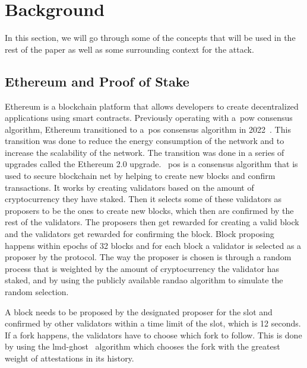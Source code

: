 
\section{Background}\label{sec:background}
In this section, we will go through some of the concepts that will be used in the rest of the paper as well as some surrounding context for the attack.

\subsection{Ethereum and Proof of Stake}\label{subsec:ethereum-and-proof-of-stake}
Ethereum is a blockchain platform that allows developers to create decentralized applications using smart contracts.
Previously operating with a~\gls{pow} consensus algorithm, Ethereum transitioned to a~\gls{pos} consensus algorithm in 2022~\cite{EthereumProof-of-stakePoS}.
This transition was done to reduce the energy consumption of the network and to increase the scalability of the network.
The transition was done in a series of upgrades called the Ethereum 2.0 upgrade.
~\gls{pos} is a consensus algorithm that is used to secure blockchain net by helping to create new blocks and confirm transactions.
It works by creating validators based on the amount of cryptocurrency they have staked.
Then it selects some of these validators as proposers to be the ones to create new blocks, which then are confirmed by the rest of the validators.
The proposers then get rewarded for creating a valid block and the validators get rewarded for confirming the block.
Block proposing happens within epochs of 32 blocks and for each block a validator is selected as a proposer by the protocol.
The way the proposer is chosen is through a random process that is weighted by the amount of cryptocurrency the validator has staked, and by using the publicly available \gls{randao} algorithm to simulate the random selection.

A block needs to be proposed by the designated proposer for the slot and confirmed by other validators within a time limit of the slot, which is 12 seconds.
If a fork happens, the validators have to choose which fork to follow.
This is done by using the \gls{lmd-ghost}~\cite{EthereumProof-of-stakePoS} algorithm which chooses the fork with the greatest weight of attestations in its history.

